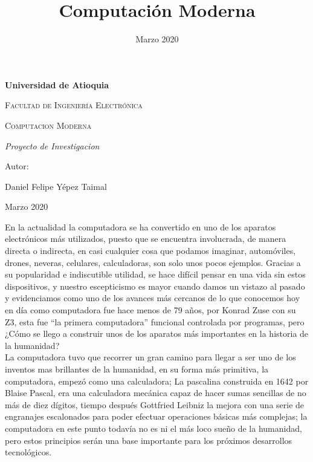 \documentclass{article}
\title{Computación Moderna}
\date{Marzo 2020}
\begin{document}
\begin{titlepage}
\centering
{\bfseries\LARGE Universidad de Atioquia\par}
\vspace{1cm}
{\scshape\Large Facultad de Ingenier\'ia Electr\'onica \par}
\vspace{3cm}
{\scshape\Huge Computacion Moderna \par}
\vspace{3cm}
{\itshape\Large Proyecto de Investigacion \par}
\vfill
{\Large Autor: \par}
{\Large Daniel Felipe Y\'epez Taimal \par}
\vfill
{\Large Marzo 2020 \par}
\end{titlepage}


\maketitle

En la actualidad la computadora se ha convertido en uno de los aparatos electrónicos más utilizados, puesto que se encuentra involucrada, de manera directa o indirecta, en casi cualquier cosa que podamos imaginar, automóviles, drones, neveras, celulares, calculadoras, son solo unos pocos ejemplos. Gracias a su popularidad e indiscutible utilidad, se hace difícil pensar en una vida sin estos dispositivos, y nuestro escepticismo es mayor cuando damos un vistazo al pasado y evidenciamos como uno de los avances más cercanos de lo que conocemos hoy en día como computadora fue hace menos de 79 años, por Konrad Zuse con su Z3, esta fue “la primera computadora” funcional controlada por programas, pero ¿Cómo se  llego a construir unos de los aparatos más importantes en la historia de la humanidad?\\

La computadora tuvo que recorrer un gran camino para llegar a ser uno de los inventos mas brillantes de la humanidad, en su forma más primitiva, la computadora, empezó como una calculadora;\cite{His} La pascalina construida en 1642 por Blaise Pascal, era una calculadora mecánica capaz de hacer sumas sencillas de no más de diez dígitos, tiempo después Gottfried Leibniz la mejora con una serie de engranajes escalonados para poder efectuar operaciones básicas más complejas; la computadora en este punto todavía no es ni el más loco sueño de la humanidad, pero estos principios serán una base importante para los próximos desarrollos tecnológicos.\\
\end{document}
